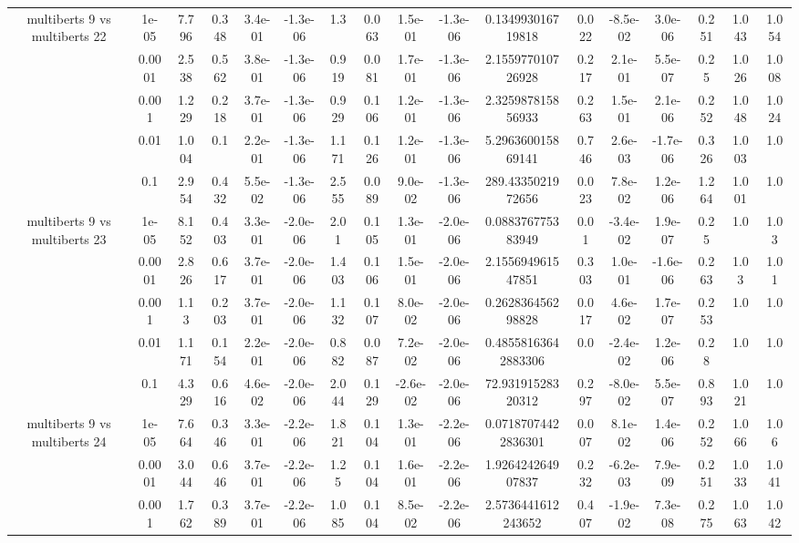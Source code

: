 \begin{tabular}{|c|c|c|c|c|c|c|c|c|c|c|c|c|c|c|c|c|}
\hline
\multirow{5}{*}{multiberts 9 vs multiberts 22} & 1e-05 & 7.796 & 0.348 & 3.4e-01 & -1.3e-06 & 1.3 & 0.063 & 1.5e-01 & -1.3e-06 & 0.134993016719818 & 0.022 & -8.5e-02 & 3.0e-06 & 0.251 & 1.043 & 1.054 \\
 & 0.0001 & 2.538 & 0.562 & 3.8e-01 & -1.3e-06 & 0.919 & 0.081 & 1.7e-01 & -1.3e-06 & 2.155977010726928 & 0.217 & 2.1e-01 & 5.5e-07 & 0.25 & 1.026 & 1.008 \\
 & 0.001 & 1.229 & 0.218 & 3.7e-01 & -1.3e-06 & 0.929 & 0.106 & 1.2e-01 & -1.3e-06 & 2.325987815856933 & 0.263 & 1.5e-01 & 2.1e-06 & 0.252 & 1.048 & 1.024 \\
 & 0.01 & 1.004 & 0.1 & 2.2e-01 & -1.3e-06 & 1.171 & 0.126 & 1.2e-01 & -1.3e-06 & 5.296360015869141 & 0.746 & 2.6e-03 & -1.7e-06 & 0.326 & 1.003 & 1.0 \\
 & 0.1 & 2.954 & 0.432 & 5.5e-02 & -1.3e-06 & 2.555 & 0.089 & 9.0e-02 & -1.3e-06 & 289.4335021972656 & 0.023 & 7.8e-02 & 1.2e-06 & 1.264 & 1.001 & 1.0 \\
\hline
\multirow{5}{*}{multiberts 9 vs multiberts 23} & 1e-05 & 8.152 & 0.403 & 3.3e-01 & -2.0e-06 & 2.01 & 0.105 & 1.3e-01 & -2.0e-06 & 0.088376775383949 & 0.01 & -3.4e-02 & 1.9e-07 & 0.25 & 1.0 & 1.03 \\
 & 0.0001 & 2.826 & 0.617 & 3.7e-01 & -2.0e-06 & 1.403 & 0.106 & 1.5e-01 & -2.0e-06 & 2.155694961547851 & 0.303 & 1.0e-01 & -1.6e-06 & 0.263 & 1.03 & 1.01 \\
 & 0.001 & 1.13 & 0.203 & 3.7e-01 & -2.0e-06 & 1.132 & 0.107 & 8.0e-02 & -2.0e-06 & 0.262836456298828 & 0.017 & 4.6e-02 & 1.7e-07 & 0.253 & 1.0 & 1.0 \\
 & 0.01 & 1.171 & 0.154 & 2.2e-01 & -2.0e-06 & 0.882 & 0.087 & 7.2e-02 & -2.0e-06 & 0.48558163642883306 & 0.0 & -2.4e-02 & 1.2e-06 & 0.28 & 1.0 & 1.0 \\
 & 0.1 & 4.329 & 0.616 & 4.6e-02 & -2.0e-06 & 2.044 & 0.129 & -2.6e-02 & -2.0e-06 & 72.93191528320312 & 0.297 & -8.0e-02 & 5.5e-07 & 0.893 & 1.021 & 1.0 \\
\hline
\multirow{5}{*}{multiberts 9 vs multiberts 24} & 1e-05 & 7.664 & 0.346 & 3.3e-01 & -2.2e-06 & 1.821 & 0.104 & 1.3e-01 & -2.2e-06 & 0.07187074422836301 & 0.007 & 8.1e-02 & 1.4e-06 & 0.252 & 1.066 & 1.06 \\
 & 0.0001 & 3.044 & 0.646 & 3.7e-01 & -2.2e-06 & 1.25 & 0.104 & 1.6e-01 & -2.2e-06 & 1.926424264907837 & 0.232 & -6.2e-03 & 7.9e-09 & 0.251 & 1.033 & 1.041 \\
 & 0.001 & 1.762 & 0.389 & 3.7e-01 & -2.2e-06 & 1.085 & 0.104 & 8.5e-02 & -2.2e-06 & 2.5736441612243652 & 0.407 & -1.9e-02 & 7.3e-08 & 0.275 & 1.063 & 1.042 \\

\end{tabular}
